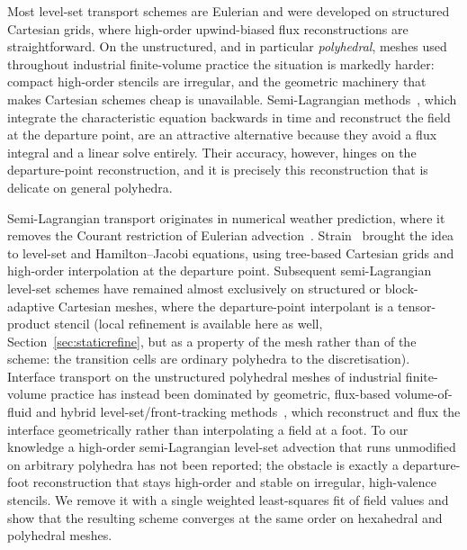\documentclass[preprint,3p,11pt]{elsarticle}
\begin{document}
Most level-set transport schemes are Eulerian and were developed on structured
Cartesian grids, where high-order upwind-biased flux reconstructions are
straightforward. On the unstructured, and in particular \emph{polyhedral}, meshes
used throughout industrial finite-volume practice the situation is markedly harder:
compact high-order stencils are irregular, and the geometric machinery that makes
Cartesian schemes cheap is unavailable. Semi-Lagrangian
methods~\cite{staniforth1991,strain1999}, which integrate the characteristic
equation backwards in time and reconstruct the field at the departure point, are an
attractive alternative because they avoid a flux integral and a linear solve
entirely. Their accuracy, however, hinges on the departure-point reconstruction,
and it is precisely this reconstruction that is delicate on general polyhedra.

Semi-Lagrangian transport originates in numerical weather prediction, where it
removes the Courant restriction of Eulerian advection~\cite{staniforth1991}.
Strain~\cite{strain1999} brought the idea to level-set and Hamilton--Jacobi
equations, using tree-based Cartesian grids and high-order interpolation at the
departure point. Subsequent semi-Lagrangian level-set schemes have remained almost
exclusively on structured or block-adaptive Cartesian meshes, where the
departure-point interpolant is a tensor-product stencil (local refinement is
available here as well, Section~\ref{sec:staticrefine}, but as a property of the
mesh rather than of the scheme: the transition cells are ordinary polyhedra to the
discretisation). Interface transport on the
unstructured polyhedral meshes of industrial finite-volume practice has instead been
dominated by geometric, flux-based volume-of-fluid and hybrid level-set/front-tracking
methods~\cite{roenby2016,maric2020,maric2015lent}, which reconstruct and flux the
interface geometrically rather than interpolating a field at a foot. To our knowledge
a high-order semi-Lagrangian level-set advection that runs unmodified on arbitrary
polyhedra has not been reported; the obstacle is exactly a departure-foot
reconstruction that stays high-order and stable on irregular, high-valence stencils.
We remove it with a single weighted least-squares fit of field values and show that
the resulting scheme converges at the same order on hexahedral and polyhedral meshes.
\end{document}
